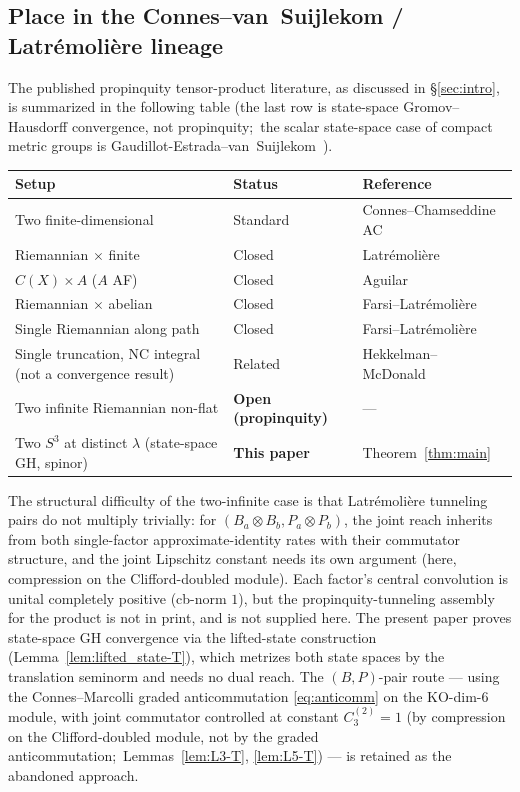 \documentclass[11pt,a4paper]{article}
\theoremstyle{plain}
\theoremstyle{definition}
\newcommand{\sthree}{S^{3}}
\begin{document}
\subsection{Place in the Connes--van~Suijlekom / Latr\'emoli\`ere
lineage}\label{sec:place_in_lineage}

The published propinquity tensor-product literature, as discussed in
\S\ref{sec:intro}, is summarized in the following table (the last row is
state-space Gromov--Hausdorff convergence, not propinquity;\ the scalar
state-space case of compact metric groups is
Gaudillot-Estrada--van~Suijlekom~\cite{gaudillot_vs2025}).

\begin{center}
\begin{tabular}{lll}
\toprule
Setup & Status & Reference \\
\midrule
Two finite-dimensional & Standard & Connes--Chamseddine AC \\
Riemannian $\times$ finite & Closed & Latr\'emoli\`ere~\cite{latremoliere2026} \\
$C(X) \times A$ ($A$ AF) & Closed & Aguilar~\cite{aguilar2019} \\
Riemannian $\times$ abelian & Closed & Farsi--Latr\'emoli\`ere~\cite{farsi_latremoliere2024} \\
Single Riemannian along path & Closed & Farsi--Latr\'emoli\`ere~\cite{farsi_latremoliere2025} \\
Single truncation, NC integral (not a convergence result) & Related & Hekkelman--McDonald~\cite{hekkelman_mcdonald2024b} \\
Two infinite Riemannian non-flat & \textbf{Open (propinquity)} & --- \\
\midrule
Two $\sthree$ at distinct $\lambda$ (state-space GH, spinor) & \textbf{This paper} & Theorem~\ref{thm:main} \\
\bottomrule
\end{tabular}
\end{center}

The structural difficulty of the two-infinite case is that
Latr\'emoli\`ere tunneling pairs do not multiply trivially: for
$(B_a \otimes B_b, P_a \otimes P_b)$, the joint reach inherits from
both single-factor approximate-identity rates with their commutator
structure, and the joint Lipschitz constant needs its own argument
(here, compression on the Clifford-doubled module). Each factor's central convolution is unital completely positive
(cb-norm $1$), but the propinquity-tunneling
assembly for the product is not in print, and is not supplied here. The
present paper proves state-space GH convergence via the lifted-state construction
(Lemma~\ref{lem:lifted_state-T}), which metrizes both state spaces by the
translation seminorm and needs no dual reach. The $(B,P)$-pair route ---
using the Connes--Marcolli graded anticommutation \eqref{eq:anticomm} on
the KO-dim-6 module, with joint commutator controlled at constant
$C_3^{(2)} = 1$ (by compression on the Clifford-doubled module, not by the
graded anticommutation;\ Lemmas~\ref{lem:L3-T}, \ref{lem:L5-T}) --- is
retained as the abandoned approach.
\end{document}
